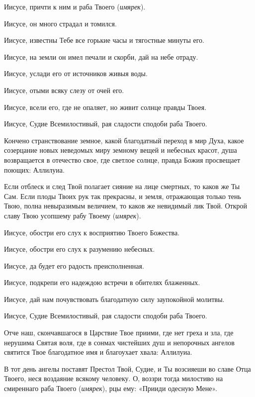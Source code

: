 \begin{mymulticols}
Иисусе, причти к ним и раба Твоего ({\itshape имярек}). 

Иисусе, он много страдал и томился. 

Иисусе, известны Тебе все горькие часы и тягостные минуты его. 

Иисусе, на земли он имел печали и скорби, дай на небе отраду. 

Иисусе, услади его от источников живыя воды. 

Иисусе, отыми всяку слезу от очей его. 

Иисусе, всели его, где не опаляет, но живит солнце правды Твоея. 

Иисусе, Судие Всемилостивый, рая сладости сподоби раба Твоего.




Кончено странствование земное, какой благодатный переход в мир Духа, какое созерцание новых неведомых миру земному вещей и небесных красот, душа возвращается в отечество свое, где светлое солнце, правда Божия просвещает поющих: Аллилуиа.




Если отблеск и след Твой полагает сияние на лице смертных, то каков же Ты Сам. Если плоды Твоих рук так прекрасны, и земля, отражающая только тень Твою, полна невыразимым величием, то каков же невидимый лик Твой. Открой славу Твою усопшему рабу Твоему ({\itshape имярек}). 

Иисусе, обостри его слух к восприятию Твоего Божества. 

Иисусе, обостри его слух к разумению небесных. 

Иисусе, да будет его радость преисполненная. 

Иисусе, подкрепи его надеждою встречи в обителях блаженных. 

Иисусе, дай нам почувствовать благодатную силу заупокойной молитвы. 

Иисусе, Судие Всемилостивый, рая сладости сподоби раба Твоего.




Отче наш, скончавшагося в Царствие Твое приими, где нет греха и зла, где нерушима Святая воля, где в сонмах чистейших душ и непорочных ангелов святится Твое благодатное имя и благоухает хвала: Аллилуиа.




В тот день ангелы поставят Престол Твой, Судие, и Ты возсияеши во славе Отца Твоего, неся воздаяние всякому человеку. О, воззри тогда милостиво на смиреннаго раба Твоего ({\itshape имярек}), рцы ему: «Прииди одесную Мене». 


\end{mymulticols}
